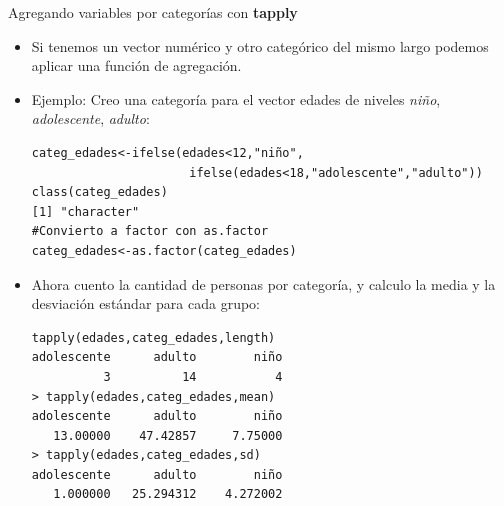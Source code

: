 \documentclass[handout]{beamer}
\begin{document}
\begin{frame}[fragile]{Agregando variables por categorías con \textbf{tapply}}
\scriptsize{
\begin{itemize}
 \item Si tenemos un vector numérico y otro categórico del mismo largo podemos aplicar una función de agregación.
 \item Ejemplo: Creo una categoría para el vector edades de niveles \emph{niño}, \emph{adolescente}, \emph{adulto}:
 \begin{verbatim}
categ_edades<-ifelse(edades<12,"niño",
                      ifelse(edades<18,"adolescente","adulto"))
class(categ_edades)
[1] "character"
#Convierto a factor con as.factor
categ_edades<-as.factor(categ_edades)
 \end{verbatim}

 \item Ahora cuento la cantidad de personas por categoría, y calculo la media y la desviación estándar para cada grupo:
\begin{verbatim}
tapply(edades,categ_edades,length)
adolescente      adulto        niño 
          3          14           4 
> tapply(edades,categ_edades,mean)
adolescente      adulto        niño 
   13.00000    47.42857     7.75000 
> tapply(edades,categ_edades,sd)
adolescente      adulto        niño 
   1.000000   25.294312    4.272002 
  
\end{verbatim}

 
\end{itemize}



}
\end{frame}
\end{document}
